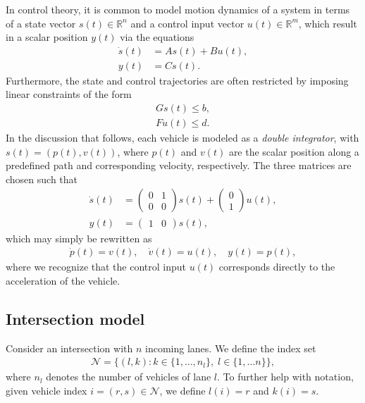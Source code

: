 \documentclass[a4paper]{article}
\theoremstyle{definition}
\theoremstyle{plain}
\begin{document}
In control theory, it is common to model motion dynamics of a system in terms of
a state vector $s(t) \in \mathbb{R}^{n}$ and a control input vector
$u(t) \in \mathbb{R}^{m}$, which result in a scalar position $y(t)$ via the
equations
\begin{subequations}\label{eq:control_equations}
\begin{align}
  \dot{s}(t) &= A s(t) + B u(t) , \\
  y(t) &= C s(t) .
\end{align}
\end{subequations}
%
Furthermore, the state and control trajectories are often restricted by imposing
linear constraints of the form
\begin{subequations}\label{eq:control_constraints}
\begin{align}
  G s(t) \leq b , \\
  F u(t) \leq d .
\end{align}
\end{subequations}
%
In the discussion that follows, each vehicle is modeled as a \textit{double integrator},
with $s(t) = (p(t), v(t))$, where $p(t)$ and $v(t)$ are the scalar position
along a predefined path and corresponding velocity, respectively. The three
matrices are chosen such that
\begin{align*}
  \dot{s}(t) &= \begin{pmatrix} 0 & 1 \\ 0 & 0 \end{pmatrix} s(t) + \begin{pmatrix} 0 \\ 1 \end{pmatrix} u(t), \\
  y(t) &= \begin{pmatrix} 1 & 0 \end{pmatrix} s(t),
\end{align*}
which may simply be rewritten as
\begin{align}
  \label{eq:motion_dynamics}
  \dot{p}(t) = v(t) , \quad
  \dot{v}(t) = u(t) , \quad
  y(t) = p(t) ,
\end{align}
where we recognize that the control input $u(t)$ corresponds directly to the
acceleration of the vehicle.


\subsection*{Intersection model}

Consider an intersection with $n$ incoming lanes. We define the index set
\begin{align*}
  \mathcal{N} = \{ (l, k) : k \in \{1, \dots, n_{l}\}, \; l \in \{1, \dots n\}\} ,
\end{align*}
where $n_{l}$ denotes the number of vehicles of lane $l$. To
further help with notation, given vehicle index $i = (r,s) \in \mathcal{N}$, we
define $l(i) = r$ and $k(i) = s$.
\end{document}
